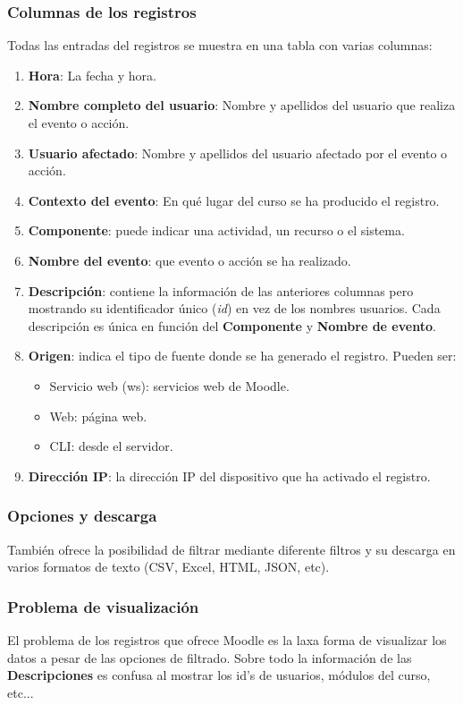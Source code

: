 \subsubsection{Columnas de los registros}
Todas las entradas del registros se muestra en una tabla con varias columnas: 
\begin{enumerate}
	\item \textbf{Hora}: La fecha y hora.
	\item \textbf{Nombre completo del usuario}: Nombre y apellidos del usuario que realiza el evento o acción.
	\item \textbf{Usuario afectado}: Nombre y apellidos del usuario afectado por el evento o acción.
	\item \textbf{Contexto del evento}: En qué lugar del curso se ha producido el registro.
	\item \textbf{Componente}: puede indicar una actividad, un recurso o el sistema.
	\item \textbf{Nombre del evento}: que evento o acción se ha realizado.
	\item \textbf{Descripción}: contiene la información de las anteriores columnas pero mostrando su identificador único (\textit{id}) en vez de los nombres usuarios. Cada descripción es única en función del \textbf{Componente} y \textbf{Nombre de evento}.
	\item \textbf{Origen}: indica el tipo de fuente donde se ha generado el registro. Pueden ser:
	\begin{itemize}
		\item Servicio web (ws): servicios web de Moodle.
		\item Web: página web.
		\item CLI: desde el servidor.
	\end{itemize}
	\item \textbf{Dirección IP}: la dirección IP del dispositivo que ha activado el registro.
	
\end{enumerate}

\subsubsection{Opciones y descarga}
También ofrece la posibilidad de filtrar mediante diferente filtros y su descarga en varios formatos de texto (CSV, Excel, HTML, JSON, etc).

\subsubsection{Problema de visualización}

El problema de los registros que ofrece Moodle es la laxa forma de visualizar los datos a pesar de las opciones de filtrado. Sobre todo la información de las \textbf{Descripciones} es confusa al mostrar los id's de usuarios, módulos del curso, etc...




